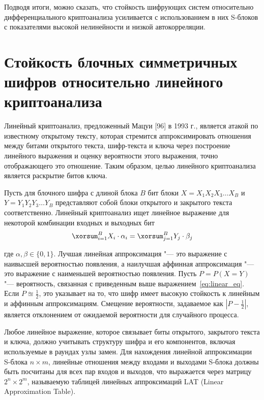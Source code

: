 Подводя итоги, можно сказать, что стойкость шифрующих систем относительно
дифференциального криптоанализа усиливается с использованием в них S-блоков с
показателями высокой нелинейности и низкой автокорреляции.

\section{Стойкость блочных симметричных шифров относительно линейного криптоанализа}

Линейный криптоанализ, предложенный Мацуи [96] в 1993 г., является атакой по
известному открытому тексту, которая стремится аппроксимировать отношения между
битами открытого текста, шифр-текста и ключа через построение линейного
выражения и оценку вероятности этого выражения, точно отображающего это
отношение. Таким образом, целью линейного криптоанализа является раскрытие битов
ключа.

Пусть для блочного шифра с длиной блока $B$ бит блоки $X = X_1 X_2 X_3 \ldots
X_B$ и $Y = Y_1 Y_2 Y_3 \ldots Y_B$ представляют собой блоки открытого и
закрытого текста соответственно. Линейный криптоанализ ищет линейное выражение
для некоторой комбинации входных и выходных бит
\begin{equation}\label{eq:linear_eq}\xorsum^{B}_{i=1} X_i \cdot \alpha_i =
\xorsum^{B}_{j=1} Y_j \cdot \beta_j\end{equation}

где $\alpha, \beta \in \{0,1\}$. Лучшая линейная аппроксимация "--- это
выражение с наивысшей вероятностью появления, а наилучшая аффинная аппроксимация
"--- это выражение с наименьшей вероятностью появления. Пусть $P = P(X = Y)$
"--- вероятность, связанная с приведенным выше выражением~\ref{eq:linear_eq}.
Если $P \approxeq \frac{1}{2}$, это указывает на то, что шифр имеет высокую
стойкость к линейным и аффинным аппроксимациям. Смещение вероятности, задаваемое
как $|P - \frac{1}{2}|$, является отклонением от ожидаемой вероятности для
случайного процесса.

Любое линейное выражение, которое связывает биты открытого, закрытого текста и
ключа, должно учитывать структуру шифра и его компонентов, включая используемые
в раундах узлы замен. Для нахождения линейной аппроксимации S-блока $n \times
m$, линейные отношения между входами и выходами S-блока должны быть посчитаны
для всех пар входов и выходов, что выражается через матрицу $2^n \times 2^m$,
называемую таблицей линейных аппроксимаций LAT (Linear Approximation Table).

